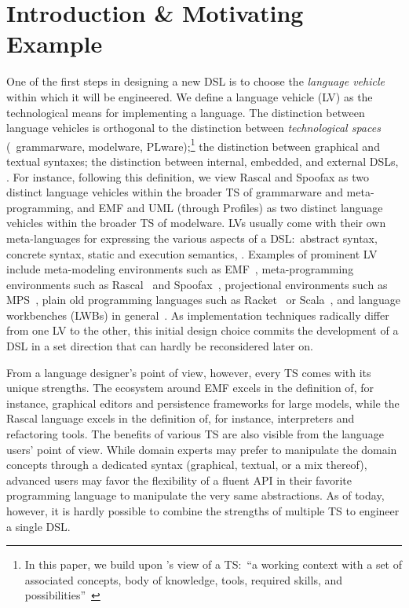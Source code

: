 \documentclass[sigplan]{acmart}
\begin{document}
\section{Introduction \& Motivating Example}
One of the first steps in designing a new DSL is to choose the \emph{language vehicle} within which it will be engineered.
We define a language vehicle (LV) as the technological means for implementing a language.
The distinction between language vehicles is orthogonal to the distinction between \emph{technological spaces} (\eg~grammarware, modelware, PLware);\footnote{In this paper, we build upon \citeauthor{kurtev2002technological}'s view of a TS:~``a working context with a set of associated concepts, body of knowledge, tools, required skills, and possibilities''~\cite{kurtev2002technological}} the distinction between graphical and textual syntaxes; the distinction between internal, embedded, and external DSLs, \etc.
For instance, following this definition, we view Rascal and Spoofax as two distinct language vehicles within the broader TS of grammarware and meta-programming, and EMF and UML (through Profiles) as two distinct language vehicles within the broader TS of modelware.
LVs usually come with their own meta-languages for expressing the various aspects of a DSL:~abstract syntax, concrete syntax, static and execution semantics, \etc.
Examples of prominent LV include meta-modeling environments such as EMF~\cite{steinberg2008emf}, meta-programming environments such as Rascal~\cite{klint2010easy} and Spoofax~\cite{kats2010spoofax}, projectional environments  such as MPS~\cite{voelter2013language}, plain old programming languages such as Racket~\cite{felleisen2018programmable} or Scala~\cite{hofer2010modular}, and language workbenches (LWBs) in general~\cite{erdweg2015evaluating}.
As implementation techniques radically differ from one LV to the other, this initial design choice commits the development of a DSL in a set direction that can hardly be reconsidered later on.

From a language designer's point of view, however, every TS comes with its unique strengths.
The ecosystem around EMF excels in the definition of, for instance, graphical editors and persistence frameworks for large models, while the Rascal language excels in the definition of, for instance, interpreters and refactoring tools.
The benefits of various TS are also visible from the language users' point of view.
While domain experts may prefer to manipulate the domain concepts through a dedicated syntax (graphical, textual, or a mix thereof), advanced users may favor the flexibility of a fluent API in their favorite programming language to manipulate the very same abstractions.
As of today, however, it is hardly possible to combine the strengths of multiple TS to engineer a single DSL.
\end{document}
